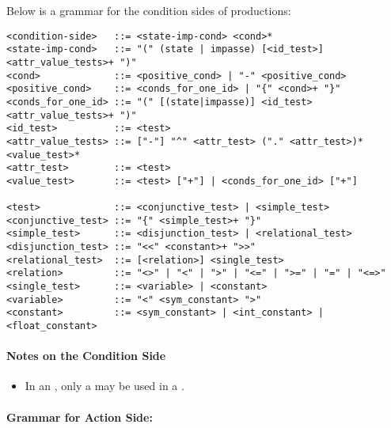 Below is a grammar for the condition sides of productions:
\begin{verbatim}
<condition-side>   ::= <state-imp-cond> <cond>*
<state-imp-cond>   ::= "(" (state | impasse) [<id_test>]
<attr_value_tests>+ ")"
<cond>             ::= <positive_cond> | "-" <positive_cond>
<positive_cond>    ::= <conds_for_one_id> | "{" <cond>+ "}"
<conds_for_one_id> ::= "(" [(state|impasse)] <id_test> 
<attr_value_tests>+ ")"
<id_test>          ::= <test>
<attr_value_tests> ::= ["-"] "^" <attr_test> ("." <attr_test>)*
<value_test>*
<attr_test>        ::= <test>
<value_test>       ::= <test> ["+"] | <conds_for_one_id> ["+"]  

<test>             ::= <conjunctive_test> | <simple_test>
<conjunctive_test> ::= "{" <simple_test>+ "}"
<simple_test>      ::= <disjunction_test> | <relational_test>
<disjunction_test> ::= "<<" <constant>+ ">>"
<relational_test>  ::= [<relation>] <single_test>
<relation>         ::= "<>" | "<" | ">" | "<=" | ">=" | "=" | "<=>"
<single_test>      ::= <variable> | <constant>
<variable>         ::= "<" <sym_constant> ">"
<constant>         ::= <sym_constant> | <int_constant> | <float_constant>
\end{verbatim}

\paragraph*{Notes on the Condition Side}\vspace{-12pt}
\begin{itemize}
	\item In an , only a  may be used in a .
\end{itemize}




\paragraph{Grammar for Action Side:}
\label{SYNTAX-pm-actgrammar}    %

